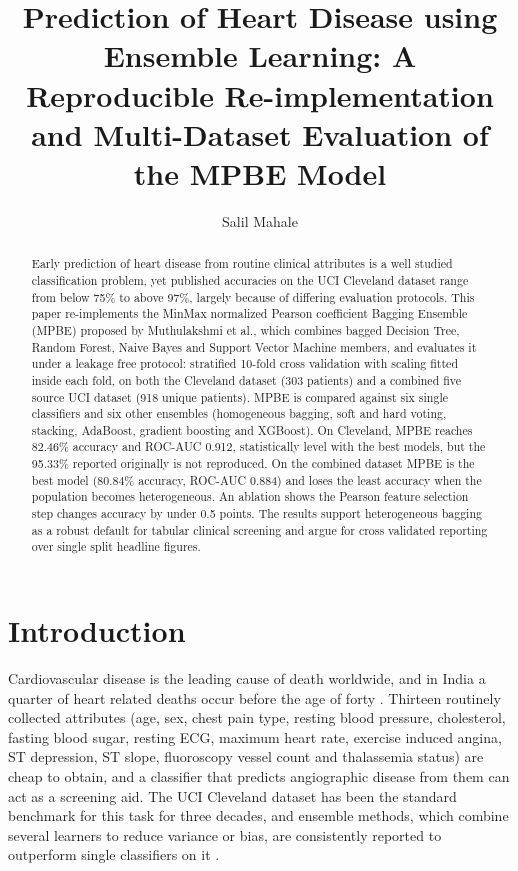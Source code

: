 \documentclass[runningheads]{llncs}
\begin{document}
\title{Prediction of Heart Disease using Ensemble Learning: A Reproducible Re-implementation and Multi-Dataset Evaluation of the MPBE Model}
\author{Salil Mahale}
\maketitle
\begin{abstract}
Early prediction of heart disease from routine clinical attributes is a well studied classification problem, yet published accuracies on the UCI Cleveland dataset range from below 75\% to above 97\%, largely because of differing evaluation protocols. This paper re-implements the MinMax normalized Pearson coefficient Bagging Ensemble (MPBE) proposed by Muthulakshmi et al., which combines bagged Decision Tree, Random Forest, Naive Bayes and Support Vector Machine members, and evaluates it under a leakage free protocol: stratified 10-fold cross validation with scaling fitted inside each fold, on both the Cleveland dataset (303 patients) and a combined five source UCI dataset (918 unique patients). MPBE is compared against six single classifiers and six other ensembles (homogeneous bagging, soft and hard voting, stacking, AdaBoost, gradient boosting and XGBoost). On Cleveland, MPBE reaches 82.46\% accuracy and ROC-AUC 0.912, statistically level with the best models, but the 95.33\% reported originally is not reproduced. On the combined dataset MPBE is the best model (80.84\% accuracy, ROC-AUC 0.884) and loses the least accuracy when the population becomes heterogeneous. An ablation shows the Pearson feature selection step changes accuracy by under 0.5 points. The results support heterogeneous bagging as a robust default for tabular clinical screening and argue for cross validated reporting over single split headline figures.
\end{abstract}
\section{Introduction}
Cardiovascular disease is the leading cause of death worldwide, and in India a quarter of heart related deaths occur before the age of forty \cite{r1}. Thirteen routinely collected attributes (age, sex, chest pain type, resting blood pressure, cholesterol, fasting blood sugar, resting ECG, maximum heart rate, exercise induced angina, ST depression, ST slope, fluoroscopy vessel count and thalassemia status) are cheap to obtain, and a classifier that predicts angiographic disease from them can act as a screening aid. The UCI Cleveland dataset \cite{r22} has been the standard benchmark for this task for three decades, and ensemble methods, which combine several learners to reduce variance or bias, are consistently reported to outperform single classifiers on it \cite{r8,r9,r14}.
\end{document}
